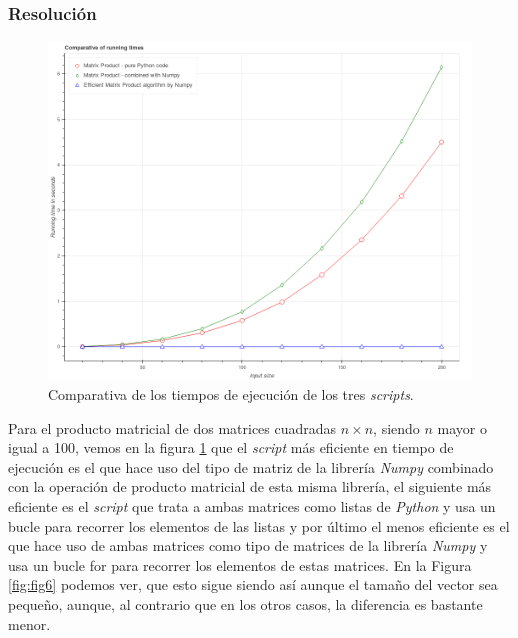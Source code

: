 \documentclass[12pt,twoside]{article}
\begin{document}
\subsubsection{Resolución}

\begin{figure}[hbt]
\begin{center}
	\includegraphics[width=1\textwidth]{41.png}
	\caption{Comparativa de los tiempos de ejecución de los tres \textit{scripts}.}
	\label{fig:fig5}
\end{center}
\end{figure}

Para el producto matricial de dos matrices cuadradas $n \times n$, siendo $n$ mayor o igual a 100, vemos en la figura \ref{fig:fig5} que el \textit{script} más eficiente en tiempo de ejecución es el que hace uso del tipo de matriz de la librería \textit{Numpy} combinado con la operación de producto matricial de esta misma librería, el siguiente más eficiente es el \textit{script} que trata a ambas matrices como listas de \textit{Python} y usa un bucle para recorrer los elementos de las listas y por último el menos eficiente es el que hace uso de ambas matrices como tipo de matrices de la librería \textit{Numpy} y usa un bucle for para recorrer los elementos de estas matrices. En la Figura \ref{fig:fig6} podemos ver, que esto sigue siendo así aunque el tamaño del vector sea pequeño, aunque, al contrario que en los otros casos, la diferencia es bastante menor.

\end{document}
